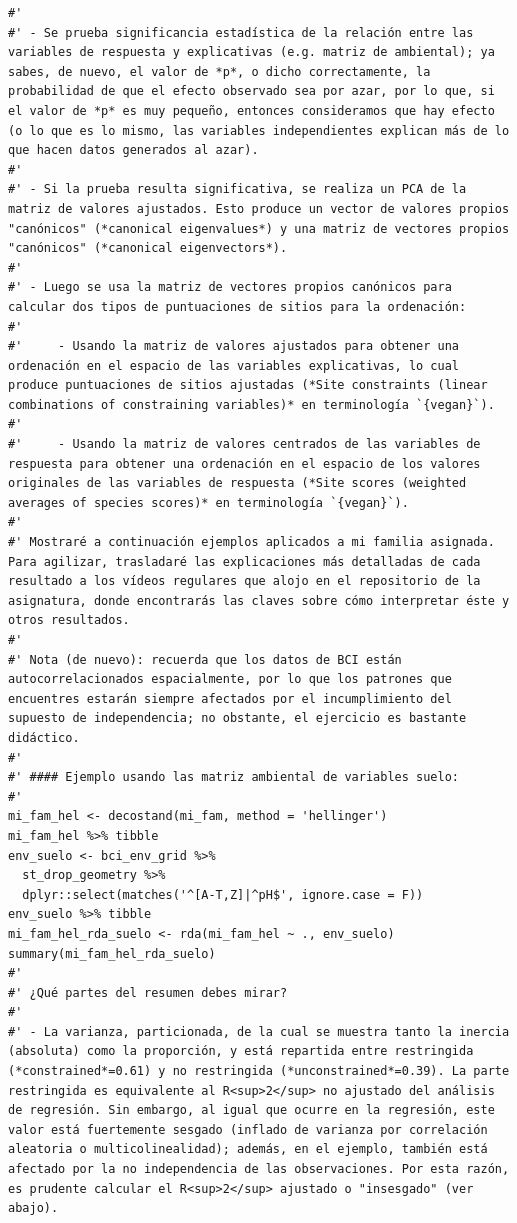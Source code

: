 \documentclass[11pt,]{article}
\begin{document}
\begin{verbatim}
#' 
#' - Se prueba significancia estadística de la relación entre las variables de respuesta y explicativas (e.g. matriz de ambiental); ya sabes, de nuevo, el valor de *p*, o dicho correctamente, la probabilidad de que el efecto observado sea por azar, por lo que, si el valor de *p* es muy pequeño, entonces consideramos que hay efecto (o lo que es lo mismo, las variables independientes explican más de lo que hacen datos generados al azar).
#' 
#' - Si la prueba resulta significativa, se realiza un PCA de la matriz de valores ajustados. Esto produce un vector de valores propios "canónicos" (*canonical eigenvalues*) y una matriz de vectores propios "canónicos" (*canonical eigenvectors*).
#' 
#' - Luego se usa la matriz de vectores propios canónicos para calcular dos tipos de puntuaciones de sitios para la ordenación:
#' 
#'     - Usando la matriz de valores ajustados para obtener una ordenación en el espacio de las variables explicativas, lo cual produce puntuaciones de sitios ajustadas (*Site constraints (linear combinations of constraining variables)* en terminología `{vegan}`).
#'     
#'     - Usando la matriz de valores centrados de las variables de respuesta para obtener una ordenación en el espacio de los valores originales de las variables de respuesta (*Site scores (weighted averages of species scores)* en terminología `{vegan}`).
#' 
#' Mostraré a continuación ejemplos aplicados a mi familia asignada. Para agilizar, trasladaré las explicaciones más detalladas de cada resultado a los vídeos regulares que alojo en el repositorio de la asignatura, donde encontrarás las claves sobre cómo interpretar éste y otros resultados.
#' 
#' Nota (de nuevo): recuerda que los datos de BCI están autocorrelacionados espacialmente, por lo que los patrones que encuentres estarán siempre afectados por el incumplimiento del supuesto de independencia; no obstante, el ejercicio es bastante didáctico.
#' 
#' #### Ejemplo usando las matriz ambiental de variables suelo:
#' 
mi_fam_hel <- decostand(mi_fam, method = 'hellinger')
mi_fam_hel %>% tibble
env_suelo <- bci_env_grid %>%
  st_drop_geometry %>%
  dplyr::select(matches('^[A-T,Z]|^pH$', ignore.case = F))
env_suelo %>% tibble
mi_fam_hel_rda_suelo <- rda(mi_fam_hel ~ ., env_suelo)
summary(mi_fam_hel_rda_suelo)
#' 
#' ¿Qué partes del resumen debes mirar?
#' 
#' - La varianza, particionada, de la cual se muestra tanto la inercia (absoluta) como la proporción, y está repartida entre restringida (*constrained*=0.61) y no restringida (*unconstrained*=0.39). La parte restringida es equivalente al R<sup>2</sup> no ajustado del análisis de regresión. Sin embargo, al igual que ocurre en la regresión, este valor está fuertemente sesgado (inflado de varianza por correlación aleatoria o multicolinealidad); además, en el ejemplo, también está afectado por la no independencia de las observaciones. Por esta razón, es prudente calcular el R<sup>2</sup> ajustado o "insesgado" (ver abajo).

\end{verbatim}
\end{document}
